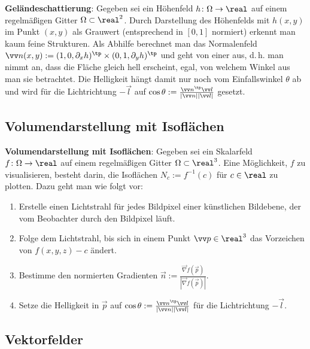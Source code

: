 \textbf{Geländeschattierung}:
Gegeben sei ein Höhenfeld $h\colon \Omega \to \real$ auf einem regelmäßigen Gitter
$\Omega \subset \real^2$.
Durch Darstellung des Höhenfelds mit $h(x, y)$ im Punkt $(x, y)$ als Grauwert
(entsprechend in $[0, 1]$ normiert) erkennt man kaum feine Strukturen.
Als Abhilfe berechnet man das Normalenfeld
$\vec{n}(x, y) := (1, 0, \partial_x h)^\tp \times (0, 1, \partial_y h)^\tp$
und geht von einer  aus,
d.\,h. man nimmt an, dass die Fläche gleich hell erscheint, egal, von welchem Winkel aus
man sie betrachtet.
Die Helligkeit hängt damit nur noch vom Einfallswinkel $\theta$ ab
und wird für die Lichtrichtung $-\vec{l}$ auf
$\cos\theta := \frac{\vec{n}^\tp \vec{l}}{|\vec{n}| |\vec{l}|}$ gesetzt.

\subsection{%
    Volumendarstellung mit Isoflächen%
}

\textbf{Volumendarstellung mit Isoflächen}:
Gegeben sei ein Skalarfeld $f\colon \Omega \to \real$ auf einem regelmäßigen Gitter
$\Omega \subset \real^3$.
Eine Möglichkeit, $f$ zu visualisieren, besteht darin,
die Isoflächen $N_c := f^{-1}(c)$ für $c \in \real$ zu plotten.
Dazu geht man wie folgt vor:
\begin{enumerate}
    \item
    Erstelle einen Lichtstrahl für jedes Bildpixel einer künstlichen Bildebene,
    der vom Beobachter durch den Bildpixel läuft.

    \item
    Folge dem Lichtstrahl, bis sich in einem Punkt $\vec{p} \in \real^3$
    das Vorzeichen von $f(x, y, z) - c$ ändert.

    \item
    Bestimme den normierten Gradienten
    $\vec{n} := \frac{\vec{\nabla} f(\vec{p})}{|\vec{\nabla} f(\vec{p})|}$.

    \item
    Setze die Helligkeit in $\vec{p}$
    auf $\cos \theta := \frac{\vec{n}^\tp \vec{l}}{|\vec{n}| |\vec{l}|}$
    für die Lichtrichtung $-\vec{l}$.
\end{enumerate}

\pagebreak

\subsection{%
    Vektorfelder%
}

